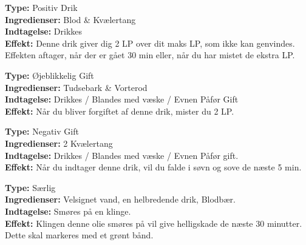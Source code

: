 \begin{drik*}[Stenhud]
\textbf{Type:} Positiv Drik\\
\textbf{Ingredienser:} Blod \& Kvælertang\\
\textbf{Indtagelse:} Drikkes\\
\textbf{Effekt:} Denne drik giver dig 2 LP over dit maks LP, som ikke kan genvindes. Effekten aftager, når der er gået 30 min eller, når du har mistet de ekstra LP.\\
\end{drik*}


\begin{gift*}
\textbf{Type:} Øjeblikkelig Gift\\
\textbf{Ingredienser:} Tudsebark \& Vorterod\\
\textbf{Indtagelse:} Drikkes / Blandes med væske / Evnen Påfør Gift\\
\textbf{Effekt:} Når du bliver forgiftet af denne drik, mister du 2 LP.\\
\end{gift*}

\begin{gift*}[Søvndrik]
\textbf{Type:} Negativ Gift\\
\textbf{Ingredienser:} 2 Kvælertang\\
\textbf{Indtagelse:} Drikkes / Blandes med væske / Evnen Påfør gift.\\
\textbf{Effekt:} Når du indtager denne drik, vil du falde i søvn og sove de næste 5 min.\\
\end{gift*}

\begin{særlig*}
\textbf{Type:} Særlig\\
\textbf{Ingredienser:} Velsignet vand, en helbredende drik, Blodbær.\\
\textbf{Indtagelse:} Smøres på en klinge.\\
\textbf{Effekt:} Klingen denne olie smøres på vil give helligskade de næste 30 minutter. Dette skal markeres med et grønt bånd.
\end{særlig*}